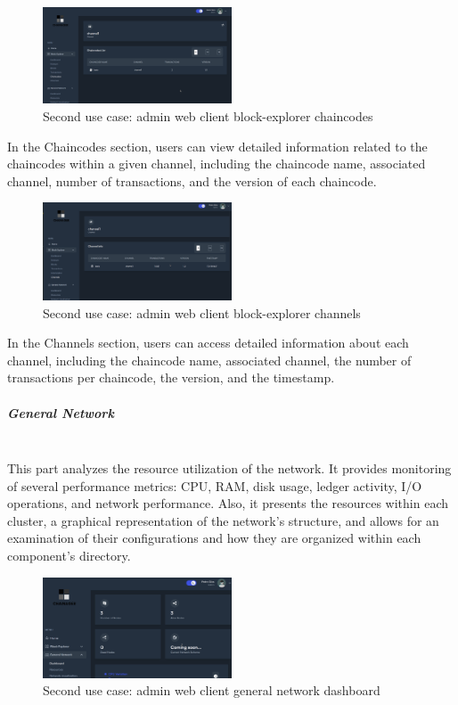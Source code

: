 \begin{figure}[H]
    \centering
    \includegraphics[width=0.5\textwidth]{assets/use-case-2/block-explorer-chaincode.png} %
    \caption{Second use case: admin web client block-explorer chaincodes}
    \label{fig:sample-image} 
\end{figure}

In the Chaincodes section, users can view detailed information related to the chaincodes within a given channel, including the chaincode name, associated channel, number of transactions, and the version of each chaincode.

\begin{figure}[H]
    \centering
    \includegraphics[width=0.5\textwidth]{assets/use-case-2/block-explorer-channels.png} %
    \caption{Second use case: admin web client block-explorer channels}
    \label{fig:sample-image} 
\end{figure}

In the Channels section, users can access detailed information about each channel, including the chaincode name, associated channel, the number of transactions per chaincode, the version, and the timestamp.

\subparagraph{General Network}\mbox{}\\
This part analyzes the resource utilization of the network. It provides monitoring of several performance metrics: CPU, RAM, disk usage, ledger activity, I/O operations, and network performance. Also, it presents the resources within each cluster, a graphical representation of the network's structure, and allows for an examination of their configurations and how they are organized within each component's directory.

\begin{figure}[H]
    \centering
    \includegraphics[width=0.5\textwidth]{assets/use-case-2/general-network-dashboard.png} %
    \caption{Second use case: admin web client general network dashboard}
    \label{fig:sample-image} 
\end{figure}

